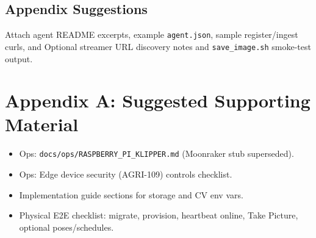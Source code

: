 \documentclass[11pt,letterpaper]{article}
\begin{document}
\subsection{Appendix Suggestions}
Attach agent README excerpts, example \texttt{agent.json}, sample register/ingest curls, and
Optional streamer URL discovery notes and \texttt{save\_image.sh} smoke-test output.

\section{Appendix A: Suggested Supporting Material}
\begin{itemize}
  \item Ops: \texttt{docs/ops/RASPBERRY\_PI\_KLIPPER.md} (Moonraker stub superseded).
  \item Ops: Edge device security (AGRI-109) controls checklist.
  \item Implementation guide sections for storage and CV env vars.
  \item Physical E2E checklist: migrate, provision, heartbeat online, Take Picture, optional
        poses/schedules.
\end{itemize}
\end{document}

